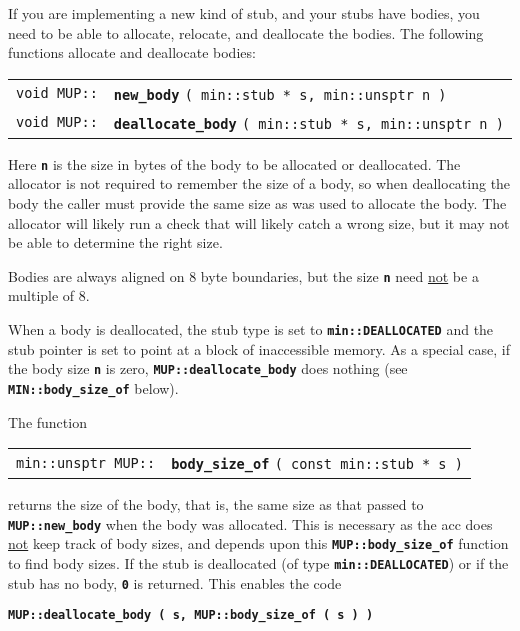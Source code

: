 \documentclass[12pt]{article}
\makeatletter
\newcommand{\TT}[1]{{\tt \bfseries #1}}
\newcommand{\ttindex}[1]{\index{#1@{\tt #1}}}
\newcommand{\MUPindex}[1]{\ttindex{MUP::#1}\ttindex{#1}}
\newcommand{\EOL}{\penalty \exhyphenpenalty}
\newenvironment{indpar}[1][0.3in]%
	{\begin{list}{}%
		     {\setlength{\itemsep}{0in}%
		      \setlength{\topsep}{0in}%
		      \setlength{\parsep}{1ex}%
		      \setlength{\labelwidth}{#1}%
		      \setlength{\leftmargin}{#1}%
		      \addtolength{\leftmargin}{\labelsep}}%
	 \item}%
	{\end{list}}
\newcommand{\LABEL}[1]{\label{#1}}
\newcommand{\MUPKEY}[1]{{\tt \bf #1}\MUPindex{#1}}
\makeatother
\begin{document}
If you are implementing a new kind of stub, and your stubs have bodies,
you need to be able to allocate, relocate, and deallocate the bodies.
The following functions allocate and deallocate bodies:

\begin{indpar}\begin{tabular}{@{}r@{}l@{}}
\verb|void MUP::|
    & \MUPKEY{new\_body} \verb|( min::stub * s, min::unsptr n )|
\LABEL{MUP::NEW_BODY} \\
\verb|void MUP::|
    & \MUPKEY{deallocate\_body} \verb|( min::stub * s, min::unsptr n )|
\LABEL{MUP::DEALLOCATE_BODY} \\
\end{tabular}\end{indpar}

Here \TT{n} is the size in bytes of the body to be allocated or deallocated.
The allocator is not required to remember the size of a body,
so when deallocating the body the caller must provide the same size
as was used to allocate the body.  The allocator will likely
run a check that will likely catch a wrong size, but it may not
be able to determine the right size.

Bodies are always aligned on 8 byte boundaries, but the size \TT{n}
need \underline{not} be a multiple of 8.

When a body is deallocated, the stub type is set to
\TT{min::DEALLOCATED} and the stub pointer is set to
point at a block of inaccessible memory.
As a special case, if the body size \TT{n} is zero,
\TT{MUP::\EOL deallocate\_\EOL body} does nothing
(see \TT{MIN::\EOL body\_\EOL size\_\EOL of} below).


The function

\begin{indpar}\begin{tabular}{@{}r@{}l@{}}
\verb|min::unsptr MUP::|
    & \MUPKEY{body\_size\_of} \verb|( const min::stub * s )|
\LABEL{MUP::BODY_SIZE_OF} \\
\end{tabular}\end{indpar}

returns the size of the body, that is, the same size
as that passed to \TT{MUP::new\_\EOL body} when the
body was allocated.  This is necessary as the acc does
\underline{not} keep track of body sizes, and depends upon
this \TT{MUP::body\_\EOL size\_\EOL of} function to
find body sizes.  If the stub is deallocated (of type
\TT{min::DEALLOCATED}) or if the stub has no body,
\TT{0} is returned.  This enables the code
\begin{center}
\TT{MUP::deallocate\_body ( s, MUP::body\_size\_of ( s ) )}
\end{center}
\end{document}

